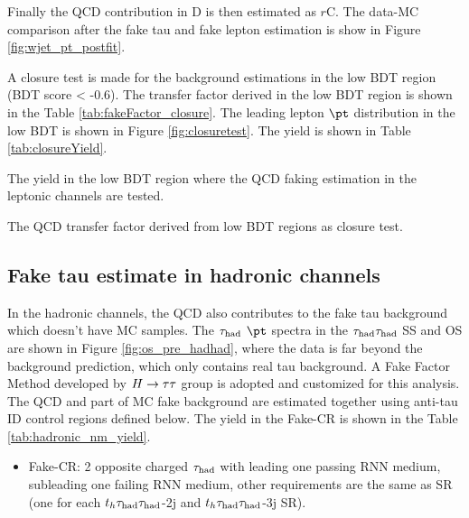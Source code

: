 Finally the QCD contribution in D is then estimated as $r$C.
The data-MC comparison after the fake tau and fake lepton estimation is show in Figure \ref{fig:wjet_pt_postfit}.


A closure test is made for the background estimations in the low BDT region (BDT score < -0.6). The transfer factor derived in the low BDT region is shown in the Table \ref{tab:fakeFactor_closure}. The leading lepton $\pt$ distribution in the low BDT is shown in Figure \ref{fig:closuretest}. The yield is shown in Table \ref{tab:closureYield}.




\begin{table}
\caption{The yield in the low BDT region where the QCD faking estimation in the leptonic channels are tested.}
\label{tab:closureYield}

\end{table}


\begin{table}
\caption{The QCD transfer factor derived from low BDT regions as closure test.}
\label{tab:fakeFactor_closure}

\end{table}

\newpage
\subsection{Fake tau estimate in hadronic channels}
\label{sec:ss_method}

In the hadronic channels, the QCD also contributes to the fake tau background which doesn't have MC samples. The $\tau_\text{had}$ $\pt$ spectra in the $\tau_\text{had}{}\tau_\text{had}$ SS and OS are shown in Figure \ref{fig:os_pre_hadhad}, where the data is far beyond the background prediction, which only contains real tau background. A Fake Factor Method developed by $H \rightarrow \tau\tau$ group \cite{Htautau-note} is adopted and customized for this analysis. The QCD and part of MC fake background are estimated together using anti-tau ID control regions defined below. The yield in the Fake-CR is shown in the Table \ref{tab:hadronic_nm_yield}. 

\begin{itemize}
\item{Fake-CR: 2 opposite charged $\tau_\text{had}$ with leading one passing RNN medium, subleading one failing RNN medium, other requirements are the same as SR (one for each  $t_h\tau_\text{had}{}\tau_\text{had}$-2j and $t_h\tau_\text{had}{}\tau_\text{had}$-3j SR).}
\end{itemize}

